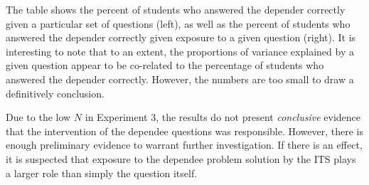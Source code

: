 The table shows the percent of students who answered the depender correctly
given a particular set of questions (left), as well as the percent of students
who answered the depender correctly given exposure to a given question (right). 
It is interesting to note that to an extent, the proportions of variance
explained by a given question appear to be co-related to the percentage of
students who answered the depender correctly.  However, the numbers are too
small to draw a definitively conclusion.

Due to the low $N$ in Experiment 3, the results do not present
\emph{conclusive} evidence that the intervention of the dependee questions was
responsible.  However, there is enough preliminary evidence to warrant further
investigation.  If there is an effect, it is suspected that exposure to the
dependee problem solution by the ITS plays a larger role than simply the
question itself.


